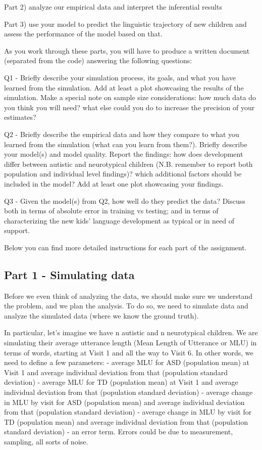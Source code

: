 \documentclass[
]{article}
\begin{document}
Part 2) analyze our empirical data and interpret the inferential results

Part 3) use your model to predict the linguistic trajectory of new
children and assess the performance of the model based on that.

As you work through these parts, you will have to produce a written
document (separated from the code) answering the following questions:

Q1 - Briefly describe your simulation process, its goals, and what you
have learned from the simulation. Add at least a plot showcasing the
results of the simulation. Make a special note on sample size
considerations: how much data do you think you will need? what else
could you do to increase the precision of your estimates?

Q2 - Briefly describe the empirical data and how they compare to what
you learned from the simulation (what can you learn from them?). Briefly
describe your model(s) and model quality. Report the findings: how does
development differ between autistic and neurotypical children (N.B.
remember to report both population and individual level findings)? which
additional factors should be included in the model? Add at least one
plot showcasing your findings.

Q3 - Given the model(s) from Q2, how well do they predict the data?
Discuss both in terms of absolute error in training vs testing; and in
terms of characterizing the new kids' language development as typical or
in need of support.

Below you can find more detailed instructions for each part of the
assignment.

\hypertarget{part-1---simulating-data}{%
\subsection{Part 1 - Simulating data}\label{part-1---simulating-data}}

Before we even think of analyzing the data, we should make sure we
understand the problem, and we plan the analysis. To do so, we need to
simulate data and analyze the simulated data (where we know the ground
truth).

In particular, let's imagine we have n autistic and n neurotypical
children. We are simulating their average utterance length (Mean Length
of Utterance or MLU) in terms of words, starting at Visit 1 and all the
way to Visit 6. In other words, we need to define a few parameters: -
average MLU for ASD (population mean) at Visit 1 and average individual
deviation from that (population standard deviation) - average MLU for TD
(population mean) at Visit 1 and average individual deviation from that
(population standard deviation) - average change in MLU by visit for ASD
(population mean) and average individual deviation from that (population
standard deviation) - average change in MLU by visit for TD (population
mean) and average individual deviation from that (population standard
deviation) - an error term. Errors could be due to measurement,
sampling, all sorts of noise.
\end{document}
